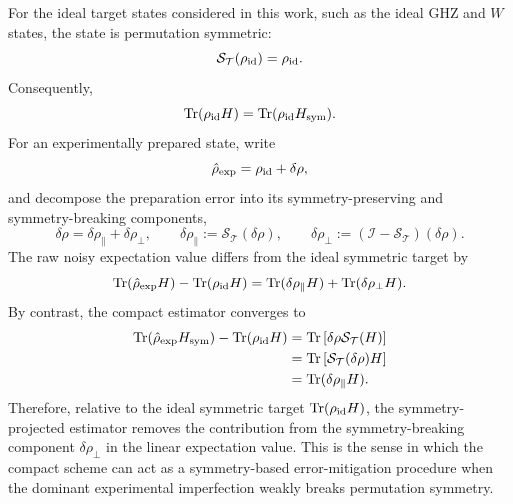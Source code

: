 \documentclass[prl,aps,notitlepage,superscriptaddress,showpacs,nofootinbib]{revtex4-2}
\begin{document}
{For the ideal target states considered in this work, such as the ideal GHZ and
$W$ states, the state is permutation symmetric:
\begin{equation}
    \mathcal{S}_{\mathcal T}(\rho_{\rm id})
    =
    \rho_{\rm id}.
\end{equation}
Consequently,
\begin{equation}
    \operatorname{Tr}(\rho_{\rm id}H)
    =
    \operatorname{Tr}(\rho_{\rm id}H_{\rm sym}).
    \label{eq:ideal_target_invariant}
\end{equation}
For an experimentally prepared state, write
\begin{equation}
    \hat{\rho}_{\rm exp}
    =
    \rho_{\rm id}
    +
    \delta\rho ,
\end{equation}
and decompose the preparation error into its symmetry-preserving and
symmetry-breaking components,
\begin{equation}
    \delta\rho
    =
    \delta\rho_{\parallel}
    +
    \delta\rho_{\perp},
    \qquad
    \delta\rho_{\parallel}
    :=
    \mathcal{S}_{\mathcal T}(\delta\rho),
    \qquad
    \delta\rho_{\perp}
    :=
    \left(
        \mathcal{I}
        -
        \mathcal{S}_{\mathcal T}
    \right)(\delta\rho).
    \label{eq:error_decomposition}
\end{equation}
The raw noisy expectation value differs from the ideal symmetric target by
\begin{equation}
    \operatorname{Tr}(\hat{\rho}_{\rm exp}H)
    -
    \operatorname{Tr}(\rho_{\rm id}H)
    =
    \operatorname{Tr}(\delta\rho_{\parallel}H)
    +
    \operatorname{Tr}(\delta\rho_{\perp}H).
    \label{eq:raw_error_decomposition}
\end{equation}
By contrast, the compact estimator converges to
\begin{align}
    \operatorname{Tr}(\hat{\rho}_{\rm exp}H_{\rm sym})
    -
    \operatorname{Tr}(\rho_{\rm id}H)
    &=
    \operatorname{Tr}
    \left[
        \delta\rho
        \mathcal{S}_{\mathcal T}(H)
    \right]                                           \notag \\
    &=
    \operatorname{Tr}
    \left[
        \mathcal{S}_{\mathcal T}(\delta\rho)H
    \right]                                           \notag \\
    &=
    \operatorname{Tr}(\delta\rho_{\parallel}H).
    \label{eq:compact_error_decomposition}
\end{align}
Therefore, relative to the ideal symmetric target
$\operatorname{Tr}(\rho_{\rm id}H)$, the symmetry-projected estimator removes
the contribution from the symmetry-breaking component
$\delta\rho_{\perp}$ in the linear expectation value. This is the sense in
which the compact scheme can act as a symmetry-based error-mitigation procedure
when the dominant experimental imperfection weakly breaks permutation symmetry.

}
\end{document}
